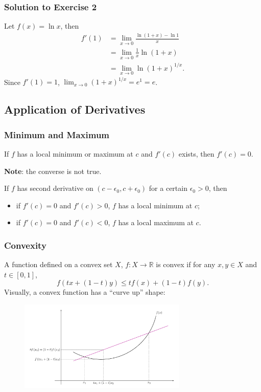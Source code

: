 \documentclass{beamer}
\begin{document}
\begin{frame}
\frametitle{Solution to Exercise 2}
Let $f(x) = \ln x$, then
\begin{equation*}
\begin{aligned}
f'(1) &= \lim_{x \rightarrow 0} \frac{\ln (1+x) - \ln 1}{x} \\
&= \lim_{x \rightarrow 0} \frac{1}{x} \ln (1+x) \\
&= \lim_{x \rightarrow 0} \ln (1+x)^{1/x}.
\end{aligned}
\end{equation*}
Since $f'(1)=1$, $\lim_{x \rightarrow 0} (1+x)^{1/x} = e^{1} = e$.
\end{frame}


\subsection{Application of Derivatives}

\begin{frame}
\frametitle{Minimum and Maximum}
\begin{theorem}
If $f$ has a local minimum or maximum at $c$ and $f'(c)$ exists, then $f'(c)=0$.
\end{theorem}
\textbf{Note}: the converse is not true.
\vspace*{0.15in}
\begin{theorem}
If $f$ has second derivative on $(c-\epsilon_0,c+\epsilon_0)$ for a certain $\epsilon_0 > 0$, then
\begin{itemize}
\item if $f'(c)= 0 $ and $f'(c) > 0$, $f$ has a local minimum at $c$;
\item if $f'(c)= 0$ and $f'(c) < 0$, $f$ has a local maximum at $c$.
\end{itemize}
\end{theorem}
\end{frame}

\begin{frame}
\frametitle{Convexity}
A function defined on a convex set $X$, $f: X \rightarrow \mathbb{R}$ is convex if for any $x,y \in X$ and $t \in [0,1]$, 
$$
f(tx+(1-t)y) \leq tf(x) + (1-t)f(y).
$$
Visually, a convex function has a ``curve up'' shape:
\begin{figure}
\centering
\includegraphics[width=8cm]{Convex-Function.png}
\end{figure}

\end{frame}
\end{document}
